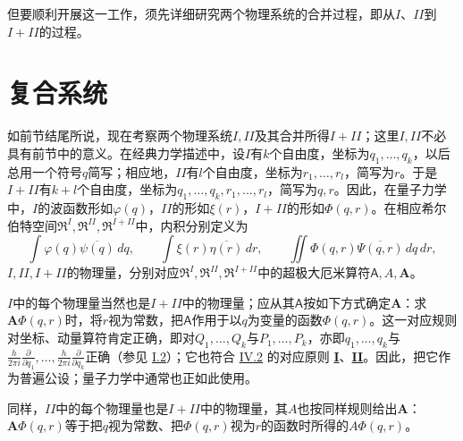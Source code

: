 \documentclass[fontsize=13pt,twoside,openany,headings=normal,parskip=false,bookmarkpackage=false,DIV=calc]{scrbook}
\begin{document}
\hypertarget{origpage-225}{}\label{origpage-225}但要顺利开展这一工作，须先详细研究两个物理系统的合并过程，即从$I$、$II$到$I+II$的过程。

\section{复合系统}\label{sec:VI.2}
如前节结尾所说，现在考察两个物理系统$I,\allowbreak II$及其合并所得$I+II$；这里$I,\allowbreak II$不必具有前节中的意义。在经典力学描述中，设$I$有$k$个自由度，坐标为$q_1,\allowbreak \ldots,\allowbreak q_k$，以后总用一个符号$q$简写；相应地，$II$有$l$个自由度，坐标为$r_1,\allowbreak \ldots,\allowbreak r_l$，简写为$r$。于是$I+II$有$k+l$个自由度，坐标为$q_1,\allowbreak \ldots,\allowbreak q_k,\allowbreak r_1,\allowbreak \ldots,\allowbreak r_l$，简写为$q,\allowbreak r$。因此，在量子力学中，$I$的波函数形如$\varphi(q)$，$II$的形如$\xi(r)$，$I+II$的形如$\Phi(q,\allowbreak r)$。在相应希尔伯特空间$\mathfrak R^I,\allowbreak \mathfrak R^{II},\allowbreak \mathfrak R^{I+II}$中，内积分别定义为
\[
 \int\varphi(q)\overline{\psi(q)}\,dq,\qquad
 \int\xi(r)\overline{\eta(r)}\,dr,\qquad
 \iint\Phi(q,r)\overline{\Psi(q,r)}\,dq\,dr,
\]
$I,\allowbreak II,\allowbreak I+II$的物理量，分别对应$\mathfrak R^I,\allowbreak \mathfrak R^{II},\allowbreak \mathfrak R^{I+II}$中的超极大厄米算符$\mathsf A,\allowbreak A,\allowbreak \boldsymbol A$。

$I$中的每个物理量当然也是$I+II$中的物理量；应从其$\mathsf A$按如下方式确定$\boldsymbol A$：求$\boldsymbol A\Phi(q,\allowbreak r)$时，将$r$视为常数，把$\mathsf A$作用于以$q$为变量的函数$\Phi(q,\allowbreak r)$。这一对应规则对坐标、动量算符肯定正确，即对$Q_1,\allowbreak \ldots,\allowbreak Q_k$与$P_1,\allowbreak \ldots,\allowbreak P_k$，亦即$q_1,\allowbreak \ldots,\allowbreak q_k$与$\frac{h}{2\pi i}\frac{\partial}{\partial q_1},\allowbreak \ldots,\allowbreak \frac{h}{2\pi i}\frac{\partial}{\partial q_k}$正确（参见 \hyperref[sec:I.2]{I.2}）；它也符合 \hyperref[sec:IV.2]{IV.2} 的对应原则 \hyperref[cond:IV.2.I]{\textbf{I}}、\hyperref[cond:IV.2.II]{\textbf{II}}。因此，把它作为普遍公设；量子力学中通常也正如此使用。

同样，$II$中的每个物理量也是$I+II$中的物理量，其$A$也按同样规则给出$\boldsymbol A$：$\boldsymbol A\Phi(q,\allowbreak r)$等于把$q$视为常数、把$\Phi(q,\allowbreak r)$视为$r$的函数时所得的$A\Phi(q,\allowbreak r)$。
\end{document}
